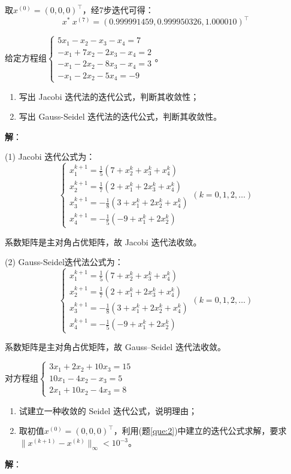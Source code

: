 \documentclass[UTF8,a4paper,11pt,oneside]{ctexbook}
\begin{document}
取\(x^{(0)}=(0,0,0)^\top\)，经7步迭代可得：
\[
x^*~x^{(7)}=(0.999991459,0.999950326,1.000010)^\top
\]

\vspace{4em}
给定方程组\(\begin{cases}
    5x_1-x_2-x_3-x_4=7\\
    -x_1+7x_2-2x_3-x_4=2\\
    -x_1-2x_2-8x_3-x_4=3\\
    -x_1-2x_2-5x_4=-9
\end{cases}\)。
\begin{enumerate}
    \item 写出 Jacobi 迭代法的迭代公式，判断其收敛性；
    \item 写出 Gauss-Seidel 迭代法的迭代公式，判断其收敛性。
\end{enumerate}
\textbf{解}：

(1) Jacobi 迭代公式为：
\[
\begin{cases}
    x_1^{k+1}=\frac{1}{5}(7+x_2^k+x_3^k+x_4^k)\\
    x_2^{k+1}=\frac{1}{7}(2+x_1^k+2x_3^k+x_4^k)\\
    x_3^{k+1}=-\frac{1}{8}(3+x_1^k+2x_2^k+x_4^k)\\
    x_4^{k+1}=-\frac{1}{5}(-9+x_1^k+2x_2^k)
\end{cases}(k=0,1,2,\ldots)
\]

系数矩阵是主对角占优矩阵，故 Jacobi 迭代法收敛。

(2) Gauss-Seidel迭代法公式为：
\[
\begin{cases}
    x_1^{k+1}=\frac{1}{5}(7+x_2^k+x_3^k+x_4^k)\\
    x_2^{k+1}=\frac{1}{7}(2+x_1^k+2x_3^k+x_4^k)\\
    x_3^{k+1}=-\frac{1}{8}(3+x_1^k+2x_2^k+x_4^k)\\
    x_4^{k+1}=-\frac{1}{5}(-9+x_1^k+2x_2^k)
\end{cases}(k=0,1,2,\ldots)
\]

系数矩阵是主对角占优矩阵，故 Gauss--Seidel 迭代法收敛。

\vspace{4em}
对方程组\(\begin{cases}
    3x_1+2x_2+10x_3=15\\
    10x_1-4x_2-x_3=5\\
    2x_1+10x_2-4x_3=8
\end{cases}\)
\begin{enumerate}
    \item 试建立一种收敛的 Seidel 迭代公式，说明理由；\label{que:2}
    \item 取初值\(x^{(0)}=(0,0,0)^\top\)，利用(题\ref{que:2})中建立的迭代公式求解，要求\(\|x^{(k+1)}-x^{(k)}\|_\infty<10^{-3}\)。
\end{enumerate}
\textbf{解}：
\end{document}
